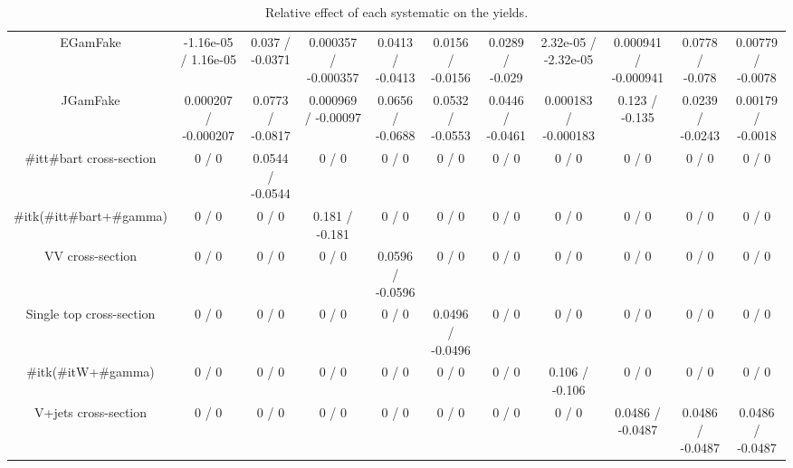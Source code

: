 \begin{table}[htbp]
\begin{center}
\begin{tabular}{|c|c|c|c|c|c|c|c|c|c|c|}
  EGamFake & -1.16e-05 / 1.16e-05 & 0.037 / -0.0371 & 0.000357 / -0.000357 & 0.0413 / -0.0413 & 0.0156 / -0.0156 & 0.0289 / -0.029 & 2.32e-05 / -2.32e-05 & 0.000941 / -0.000941 & 0.0778 / -0.078 & 0.00779 / -0.0078 \\ 
  JGamFake & 0.000207 / -0.000207 & 0.0773 / -0.0817 & 0.000969 / -0.00097 & 0.0656 / -0.0688 & 0.0532 / -0.0553 & 0.0446 / -0.0461 & 0.000183 / -0.000183 & 0.123 / -0.135 & 0.0239 / -0.0243 & 0.00179 / -0.0018 \\ 
  #it{t#bar{t}} cross-section & 0 / 0 & 0.0544 / -0.0544 & 0 / 0 & 0 / 0 & 0 / 0 & 0 / 0 & 0 / 0 & 0 / 0 & 0 / 0 & 0 / 0 \\ 
  #it{k}(#it{t#bar{t}+#gamma}) & 0 / 0 & 0 / 0 & 0.181 / -0.181 & 0 / 0 & 0 / 0 & 0 / 0 & 0 / 0 & 0 / 0 & 0 / 0 & 0 / 0 \\ 
  VV cross-section & 0 / 0 & 0 / 0 & 0 / 0 & 0.0596 / -0.0596 & 0 / 0 & 0 / 0 & 0 / 0 & 0 / 0 & 0 / 0 & 0 / 0 \\ 
  Single top cross-section & 0 / 0 & 0 / 0 & 0 / 0 & 0 / 0 & 0.0496 / -0.0496 & 0 / 0 & 0 / 0 & 0 / 0 & 0 / 0 & 0 / 0 \\ 
  #it{k}(#it{W+#gamma}) & 0 / 0 & 0 / 0 & 0 / 0 & 0 / 0 & 0 / 0 & 0 / 0 & 0.106 / -0.106 & 0 / 0 & 0 / 0 & 0 / 0 \\ 
  V+jets cross-section & 0 / 0 & 0 / 0 & 0 / 0 & 0 / 0 & 0 / 0 & 0 / 0 & 0 / 0 & 0.0486 / -0.0487 & 0.0486 / -0.0487 & 0.0486 / -0.0487 \\ 
\hline 
\end{tabular} 
\caption{Relative effect of each systematic on the yields.} 
\end{center} 
\end{table} 
